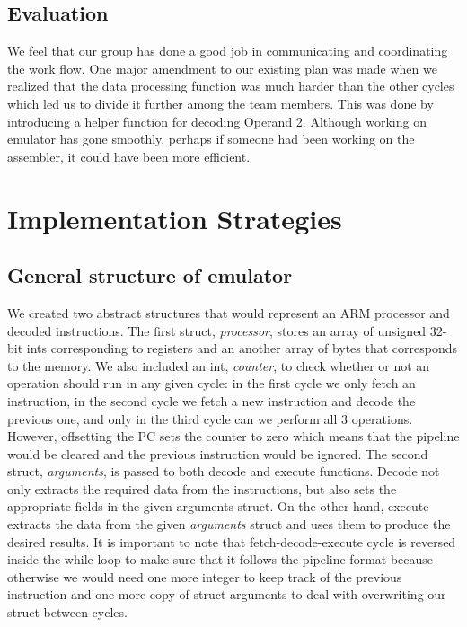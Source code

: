 \documentclass[11pt]{article}
\begin{document}
	\subsection{Evaluation}
	We feel that our group has done a good job in communicating and coordinating the work flow. One major amendment to our existing plan was made when we realized that the data processing function was much harder than the other cycles which led us to divide it further among the team members. This was done by introducing a helper function for decoding Operand 2. Although working on emulator has gone smoothly, perhaps if someone had been working on the assembler, it could have been more efficient.	
	


\section{Implementation Strategies}
	\subsection{General structure of emulator}
	We created two abstract structures that would represent an ARM processor and decoded instructions. The first struct, \textit{processor}, stores an array of unsigned 32-bit ints  corresponding to registers and an another array of bytes that corresponds to the memory. We also included an int, \textit{counter}, to check whether or not an operation should run in any given cycle: in the first cycle we only fetch an instruction, in the second cycle we fetch a new instruction and decode the previous one, and only in the third cycle can we perform all 3 operations. However, offsetting the PC sets the counter to zero which means that the pipeline would be cleared and the previous instruction would be ignored. The second struct, \textit{arguments}, is passed to both decode and execute functions. Decode not only extracts the required data from the instructions, but also sets the appropriate fields in the given arguments struct. On the other hand, execute extracts the data from the given \textit{arguments} struct and uses them to produce the desired results. It is important to note that fetch-decode-execute cycle is reversed inside the while loop to make sure that it follows the pipeline format because otherwise we would need one more integer to keep track of the previous instruction and one more copy of struct arguments to deal with overwriting our struct between cycles.
	  
\end{document}
